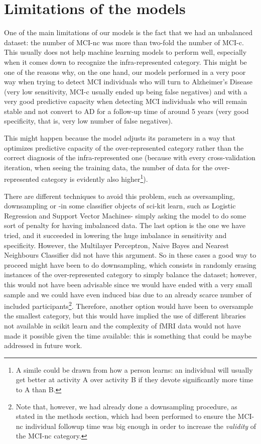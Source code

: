 \documentclass[a4paper,12pt]{elsarticle}  %
\begin{document}
		
	
	
	

	
	
	\section{Limitations of the models}  \label{limitacions}
	
	One of the main limitations of our models is the fact that we had an unbalanced dataset: the number of MCI-nc was more than two-fold the number of MCI-c. This usually does not help machine learning models to perform well, especially when it comes down to recognize the infra-represented category. This might be one of the reasons why, on the one hand, our models performed in a very poor way when trying to detect MCI individuals who will turn to Alzheimer's Disease (very low sensitivity, MCI-c usually ended up being false negatives) and with a very good predictive capacity when detecting MCI individuals who will remain stable and not convert to AD for a follow-up time of around 5 years (very good specificity, that is, very low number of false negatives). 
	
	This might happen because the model adjusts its parameters in a way that optimizes predictive capacity of the over-represented category rather than the correct diagnosis of the infra-represented one (because with every cross-validation iteration, when seeing the training data, the number of data for the over-represented category is evidently also higher\footnote{A simile could be drawn from how a person learns: an individual will usually get better at activity A over activity B if they devote significantly more time to A than B.}).
	
	There are different techniques to avoid this problem, such as oversampling, downsampling or -in some classifier objects of sci-kit learn, such as Logistic Regression and Support Vector Machines- simply asking the model to do some sort of penalty for having imbalanced data. The last option is the one we have tried, and it succeeded in lowering the huge imbalance in sensitivity and specificity. However, the Multilayer Perceptron, Naive Bayes and Nearest Neighbours Classifier did not have this argument. So in these cases a good way to proceed might have been to do downsampling, which consists in randomly erasing instances of the over-represented category to simply balance the dataset; however, this would not have been advisable since we would have ended with a very small sample and we could have even induced bias due to an already scarce number of included participants\footnote{Note that, however, we had already done a downsampling procedure, as stated in the methods section, which had been performed to ensure the MCI-nc individual followup time was big enough in order to increase the \textit{validity} of the MCI-nc category.}. Therefore, another option would have been to oversample the smallest category, but this would have implied the use of different libraries not available in scikit learn and the complexity of fMRI data would not have made it possible given the time available: this is something that could be maybe addressed in future work.
	
\end{document}
